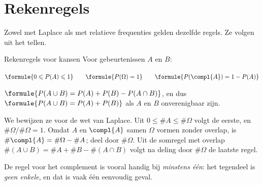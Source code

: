 \section{Rekenregels}

Zowel met Laplace als met relatieve frequenties gelden dezelfde regels. Ze volgen uit het tellen.

\begin{theorie}
\begin{stelling}{Rekenregels voor kansen}
Voor gebeurtenissen $A$ en $B$:

\vspace{1mm}
\qquad $\formule{0 \leqslant P(A) \leqslant 1} \qquad \formule{P(\Omega) = 1} \qquad \formule{P(\compl{A}) = 1 - P(A)}$

\vspace{1mm}
\qquad $\formule{P(A \cup B) = P(A) + P(B) - P(A \cap B)}$, \quad en dus $\formule{P(A \cup B) = P(A) + P(B)}$ als $A$ en $B$ onverenigbaar zijn.
\end{stelling}

\begin{bewijs}
We bewijzen ze voor de wet van Laplace. Uit $0 \leqslant \#A \leqslant \#\Omega$ volgt de eerste, en $\#\Omega / \#\Omega = 1$. Omdat $A$ en $\compl{A}$ samen $\Omega$ vormen zonder overlap, is $\#\compl{A} = \#\Omega - \#A$; deel door $\#\Omega$. Uit de somregel met overlap $\#(A \cup B) = \#A + \#B - \#(A \cap B)$ volgt na deling door $\#\Omega$ de laatste regel.
\end{bewijs}
\end{theorie}

De regel voor het complement is vooral handig bij \textit{minstens één}: het tegendeel is \textit{geen enkele}, en dat is vaak één eenvoudig geval.


\begin{oefeningen}
\end{oefeningen}

